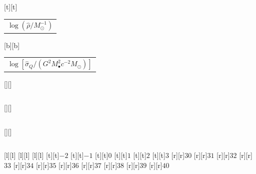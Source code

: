 %    
%
%
\begin{psfrags}%
\psfragscanon%
%
[t][t]{\color[rgb]{0,0,0}\setlength{\tabcolsep}{0pt}\begin{tabular}{c}{\Large$\log\left(\hat{\rho}/M_\odot^{-1}\right)$}\end{tabular}}%
[b][b]{\color[rgb]{0,0,0}\setlength{\tabcolsep}{0pt}\begin{tabular}{c}{\Large$\log\left[\hat{\sigma}_Q/\left(G^2 M_\bullet^2 c^{-2}M_\odot\right)\right]$}\end{tabular}}%
[][]{\color[rgb]{0,0,0}\setlength{\tabcolsep}{0pt}\begin{tabular}{c} \end{tabular}}%
[][]{\color[rgb]{0,0,0}\setlength{\tabcolsep}{0pt}\begin{tabular}{c} \end{tabular}}%
[][]{\color[rgb]{0,0,0}\setlength{\tabcolsep}{0pt}\begin{tabular}{c} \end{tabular}}%
[l][l]{\color[rgb]{0,0,0}{\large$\iota = \pi/12$}}%
[l][l]{\color[rgb]{0,0,0}{\large$\iota = \pi/4$}}%
[l][l]{\color[rgb]{0,0,0}{\large$\iota = 5\pi/12$}}%
%
[t][t]{$-2$}%
[t][t]{$-1$}%
[t][t]{$0$}%
[t][t]{$1$}%
[t][t]{$2$}%
[t][t]{$3$}%
%
[r][r]{$30$}%
[r][r]{$31$}%
[r][r]{$32$}%
[r][r]{$33$}%
[r][r]{$34$}%
[r][r]{$35$}%
[r][r]{$36$}%
[r][r]{$37$}%
[r][r]{$38$}%
[r][r]{$39$}%
[r][r]{$40$}%
%
%
\end{psfrags}%
%
